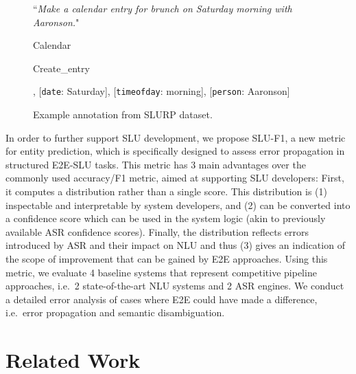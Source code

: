 \documentclass[11pt,a4paper]{article}
\newcommand{\metricname}{SLU-F1}
\newcommand{\datasetacr}{SLURP}
\newcommand{\etoe}{E2E}
\newcommand{\slu}{SLU}
\newcommand{\asr}{ASR}
\newcommand{\nlu}{NLU}
\begin{document}
\begin{figure}
\begin{tcolorbox}
\footnotesize
\begin{description}[noitemsep]
\item[User:] ``{\em Make a calendar entry for brunch on Saturday morning with Aaronson.}"
\item[Scenario:] Calendar
\item[Action:] Create\_entry
\item[Entity tags and lexical fillers:] [{\tt event\_name}: brunch], [{\tt date}: Saturday], [{\tt timeofday}: morning], [{\tt person}: Aaronson]
\end{description}
\end{tcolorbox}
\caption{Example annotation from \datasetacr{} dataset.} \label{fig:data}
\end{figure}


In order to further support \slu{} development, we propose \metricname, a new metric for entity prediction, which is specifically designed to assess  error propagation in structured \etoe-\slu{} tasks. 
 This metric has 3 main advantages over the commonly used accuracy/F1 metric, aimed at supporting \slu{} developers: First, it computes a distribution rather than a single score. This distribution is (1) inspectable and interpretable by system developers, and (2) can  be converted into a confidence score which can be used in the system logic (akin to previously available ASR confidence scores). Finally, the distribution reflects errors introduced by ASR and their impact on NLU and thus (3) gives an indication of the scope of improvement that can be gained by \etoe{} approaches.
Using this metric, we evaluate 4 baseline systems that represent competitive pipeline approaches, i.e.\ 2 state-of-the-art \nlu{} systems and 2 \asr{} engines. We conduct a detailed error analysis of cases where \etoe{} could have made a difference, i.e.\ error propagation and semantic disambiguation. 

\section{Related Work}
\label{sec:related}
\end{document}
